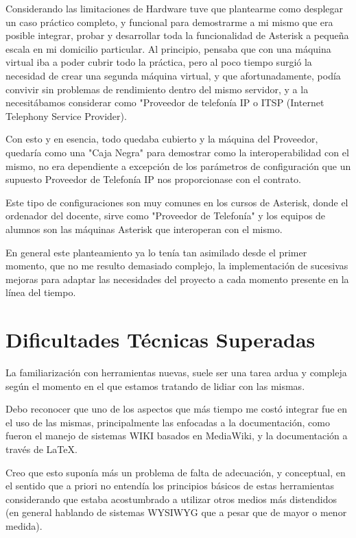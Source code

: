 Considerando las limitaciones de Hardware tuve que plantearme como desplegar un caso práctico completo, y funcional para demostrarme a mi mismo que era posible integrar, probar y desarrollar toda la funcionalidad de Asterisk a pequeña escala en mi domicilio particular. Al principio, pensaba que con una máquina virtual iba a poder cubrir todo la práctica, pero al poco tiempo surgió la necesidad de crear una segunda máquina virtual, y que afortunadamente, podía convivir sin problemas de rendimiento dentro del mismo servidor, y a la necesitábamos considerar como "Proveedor de telefonía IP o ITSP (Internet Telephony Service Provider). 

Con esto y en esencia, todo quedaba cubierto y la máquina del Proveedor, quedaría como una "Caja Negra" para demostrar como la interoperabilidad con el mismo, no era dependiente a excepción de los parámetros de configuración que un supuesto Proveedor de Telefonía IP nos proporcionase con el contrato.

Este tipo de configuraciones son muy comunes en los cursos de Asterisk, donde el ordenador del docente, sirve como "Proveedor de Telefonía" y los equipos de alumnos son las máquinas Asterisk que interoperan con el mismo.

En general este planteamiento ya lo tenía tan asimilado desde el primer momento, que no me resulto demasiado complejo, la implementación de sucesivas mejoras para adaptar las necesidades del proyecto a cada momento presente en la línea del tiempo.

\section{Dificultades Técnicas Superadas}

La familiarización con herramientas nuevas, suele ser una tarea ardua y compleja según el momento en el que estamos tratando de lidiar con las mismas.

Debo reconocer que uno de los aspectos que más tiempo me costó integrar fue en el uso de las mismas, principalmente las enfocadas a la documentación, como fueron el manejo de sistemas WIKI basados en MediaWiki, y la documentación a través de \LaTeX. 

Creo que esto suponía más un problema de falta de adecuación, y conceptual, en el sentido que a priori no entendía los principios básicos de estas herramientas considerando que estaba acostumbrado a utilizar otros medios más distendidos (en general hablando de sistemas WYSIWYG que a pesar que de mayor o menor medida).


